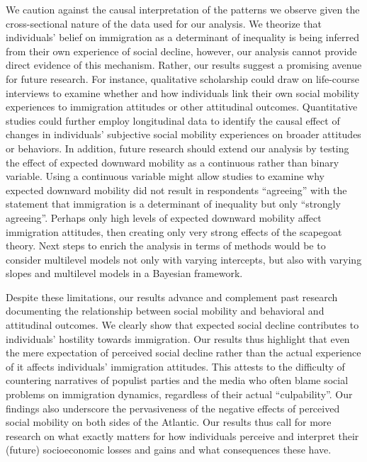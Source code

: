 \documentclass[
  11pt,
]{article}
\begin{document}
We caution against the causal interpretation of the patterns we observe
given the cross-sectional nature of the data used for our analysis. We
theorize that individuals' belief on immigration as a determinant of
inequality is being inferred from their own experience of social
decline, however, our analysis cannot provide direct evidence of this
mechanism. Rather, our results suggest a promising avenue for future
research. For instance, qualitative scholarship could draw on
life-course interviews to examine whether and how individuals link their
own social mobility experiences to immigration attitudes or other
attitudinal outcomes. Quantitative studies could further employ
longitudinal data to identify the causal effect of changes in
individuals' subjective social mobility experiences on broader attitudes
or behaviors. In addition, future research should extend our analysis by
testing the effect of expected downward mobility as a continuous rather
than binary variable. Using a continuous variable might allow studies to
examine why expected downward mobility did not result in respondents
``agreeing'' with the statement that immigration is a determinant of
inequality but only ``strongly agreeing''. Perhaps only high levels of
expected downward mobility affect immigration attitudes, then creating
only very strong effects of the scapegoat theory. Next steps to enrich
the analysis in terms of methods would be to consider multilevel models
not only with varying intercepts, but also with varying slopes and
multilevel models in a Bayesian framework.

Despite these limitations, our results advance and complement past
research documenting the relationship between social mobility and
behavioral and attitudinal outcomes. We clearly show that expected
social decline contributes to individuals' hostility towards
immigration. Our results thus highlight that even the mere expectation
of perceived social decline rather than the actual experience of it
affects individuals' immigration attitudes. This attests to the
difficulty of countering narratives of populist parties and the media
who often blame social problems on immigration dynamics, regardless of
their actual ``culpability''. Our findings also underscore the
pervasiveness of the negative effects of perceived social mobility on
both sides of the Atlantic. Our results thus call for more research on
what exactly matters for how individuals perceive and interpret their
(future) socioeconomic losses and gains and what consequences these
have.
\end{document}
